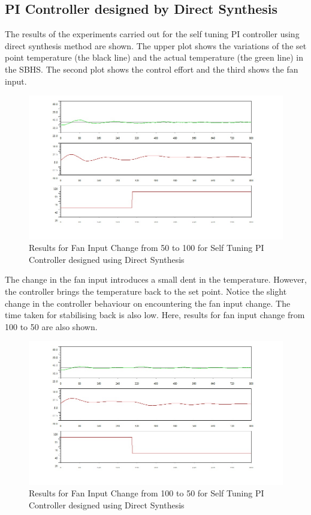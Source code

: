 \subsection{PI Controller designed by Direct Synthesis}
The results of the experiments carried out for the self tuning PI controller using direct synthesis method are shown. The upper plot shows the variations of the set point temperature (the black line) and the actual temperature (the green line) in the SBHS. The second plot shows the control effort and the third shows the fan input.

\begin{figure}[h]
	\centering
\includegraphics[width=0.7\linewidth]{Vikas_self/report_tex/PID_results/self_tuning/FanDisturbance/DirectSynthesis/step50to100.jpg}
	\caption{Results for Fan Input Change from 50 to 100 for Self Tuning PI Controller  designed using Direct Synthesis}
\end{figure}
The change in the fan input introduces a small dent in the temperature. However, the controller brings the temperature back to the set point. Notice the slight change in the controller behaviour on encountering the fan input change. The time taken for stabilising back is also low.
\newpage
Here, results for fan input change from 100 to 50 are also shown.
\begin{figure}[h]
	\centering
\includegraphics[width=0.7\linewidth]{Vikas_self/report_tex/PID_results/self_tuning/FanDisturbance/DirectSynthesis/step100to50.jpg}
	\caption{Results for Fan Input Change from 100 to 50 for Self Tuning PI Controller  designed using Direct Synthesis}
\end{figure}

